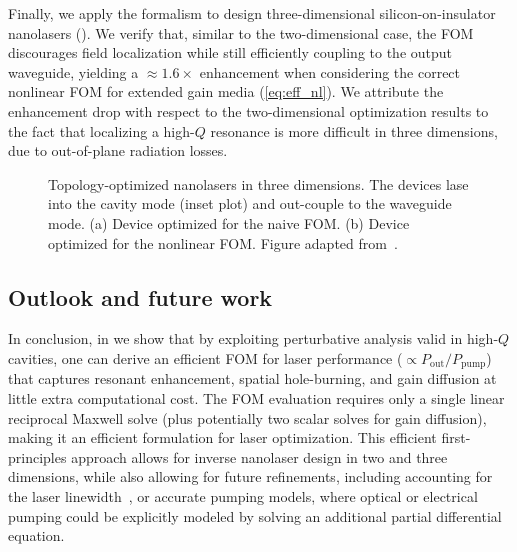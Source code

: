 Finally, we apply the formalism to design three-dimensional silicon-on-insulator nanolasers (). 
We verify that, similar to the two-dimensional case, the FOM discourages field localization while still efficiently coupling to the output waveguide, yielding a $\approx 1.6\times$
enhancement when considering the correct nonlinear FOM for extended gain media (\eqref{eq:eff_nl}). We attribute the enhancement drop with respect to the two-dimensional optimization results to the fact that localizing a high-$Q$ resonance is more difficult in three dimensions, due to out-of-plane radiation losses.

\begin{figure}[tb]
    \centering
    \caption{Topology-optimized nanolasers in three dimensions. The devices lase into the cavity mode (inset plot) and out-couple to the waveguide mode. (a) Device optimized for the naive FOM. (b) Device optimized for the nonlinear FOM.
    Figure adapted from~\cite{ownpub4}.}
    \label{fig:laser3d}
\end{figure}

\subsection*{Outlook and future work}

In conclusion, in \cite{ownpub4} we show that by exploiting perturbative analysis valid in high-$Q$ cavities, one can derive  
an efficient FOM for laser performance ($\propto P_\text{out}/P_\text{pump}$) that captures resonant enhancement,  
spatial hole-burning, and gain diffusion at little extra computational cost. The FOM evaluation requires only a  
single linear reciprocal Maxwell solve (plus potentially two scalar solves for gain diffusion), making it 
an efficient formulation for laser optimization. This efficient first-principles approach allows for inverse nanolaser design in two and three dimensions, while  
also allowing for future refinements, including accounting for the laser linewidth~\cite{pick}, or accurate pumping models, where optical or electrical pumping could be explicitly
modeled by solving an additional partial differential equation.
